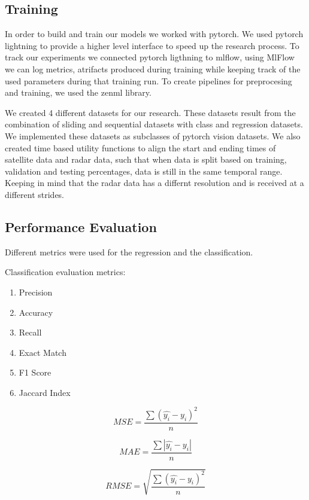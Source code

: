 \documentclass[acmtog, authorversion]{acmart}
\begin{document}
\subsection{Training}
In order to build and train our models we worked with pytorch. We used pytorch lightning to provide a higher level interface to speed up the research process. To track our experiments we connected pytorch ligthning to mlflow, using MlFlow we can log metrics, atrifacts produced during training while keeping track of the used parameters during that training run.
To create pipelines for preprocesing and training, we used the zenml library.

We created 4 different datasets for our research. These datasets result from the combination of sliding and sequential datasets with class and regression datasets.
We implemented these datasets as subclasses of pytorch vision datasets. We also created time based utility functions to align the start and ending times of satellite data and radar data, such that when data is split based on training, validation and testing percentages, data is still in the same temporal range. Keeping in mind that the radar data has a differnt resolution and is received at a different strides.

\subsection{Performance Evaluation}

Different metrics were used for the regression and the classification.

Classification evaluation metrics:
\begin{enumerate}
  \item Precision
  \item Accuracy
  \item Recall
  \item Exact Match
  \item F1 Score
  \item Jaccard Index
\end{enumerate}

\begin{equation}
  MSE = \frac{\sum (\hat{y_i} -y_i)^2}{n}
\end{equation}

\begin{equation}
MAE = \frac{\sum |\hat{y_i} -y_i|}{n}
\end{equation}

\begin{equation}
RMSE = \sqrt{\frac{\sum (\hat{y_i} -y_i)^2}{n}}
\end{equation}
\end{document}
